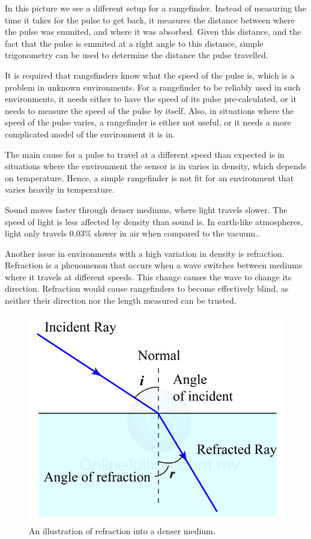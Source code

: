 In this picture we see a different setup for a rangefinder. Instead of measuring the time it takes for the pulse to get back, it measures the distance between where the pulse was emmited, and where it was absorbed. Given this distance, and the fact that the pulse is emmited at a right angle to this distance, simple trigonometry can be used to determine the distance the pulse travelled.

It is required that rangefinders know what the speed of the pulse is, which is a problem in unknown environments. For a rangefinder to be reliably used in such environments, it needs either to have the speed of its pulse pre-calculated, or it needs to measure the speed of the pulse by itself. Also, in situations where the speed of the pulse varies, a rangefinder is either not useful, or it needs a more complicated model of the environment it is in.

The main cause for a pulse to travel at a different speed than expected is in situations where the environment the sensor is in varies in density, which depends on temperature\cite{refraction}. Hence, a simple rangefinder is not fit for an environment that varies heavily in temperature.

Sound moves faster through denser mediums, where light travels slower. The speed of light is less affected by density than sound is. In earth-like atmospheres, light only travels 0.03\% slower in air when compared to the vacuum.\cite{refraction}\cite{speedOfSound}.

Another issue in environments with a high variation in density is refraction. Refraction is a phenomenon that occurs when a wave switches between mediums where it travels at different speeds. This change causes the wave to change its direction\cite{snell}. Refraction would cause rangefinders to become effectively blind, as neither their direction nor the length measured can be trusted.

\begin{figure}[H]
	\centering
	\includegraphics[width=.4\linewidth]{images/refraction.png}
	\caption{An illustration of refraction into a denser medium.}
	\label{fig:refractionIMG}
\end{figure}

